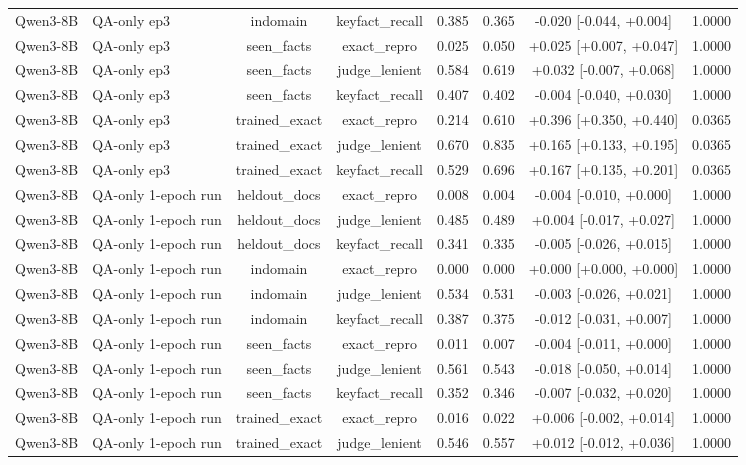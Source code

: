 \begin{table}[t]
{\begin{tabular}{llcccccc}
Qwen3-8B & QA-only ep3 & indomain & keyfact\_recall & 0.385 & 0.365 & -0.020 [-0.044, +0.004] & 1.0000 \\
Qwen3-8B & QA-only ep3 & seen\_facts & exact\_repro & 0.025 & 0.050 & +0.025 [+0.007, +0.047] & 1.0000 \\
Qwen3-8B & QA-only ep3 & seen\_facts & judge\_lenient & 0.584 & 0.619 & +0.032 [-0.007, +0.068] & 1.0000 \\
Qwen3-8B & QA-only ep3 & seen\_facts & keyfact\_recall & 0.407 & 0.402 & -0.004 [-0.040, +0.030] & 1.0000 \\
Qwen3-8B & QA-only ep3 & trained\_exact & exact\_repro & 0.214 & 0.610 & +0.396 [+0.350, +0.440] & 0.0365 \\
Qwen3-8B & QA-only ep3 & trained\_exact & judge\_lenient & 0.670 & 0.835 & +0.165 [+0.133, +0.195] & 0.0365 \\
Qwen3-8B & QA-only ep3 & trained\_exact & keyfact\_recall & 0.529 & 0.696 & +0.167 [+0.135, +0.201] & 0.0365 \\
Qwen3-8B & QA-only 1-epoch run & heldout\_docs & exact\_repro & 0.008 & 0.004 & -0.004 [-0.010, +0.000] & 1.0000 \\
Qwen3-8B & QA-only 1-epoch run & heldout\_docs & judge\_lenient & 0.485 & 0.489 & +0.004 [-0.017, +0.027] & 1.0000 \\
Qwen3-8B & QA-only 1-epoch run & heldout\_docs & keyfact\_recall & 0.341 & 0.335 & -0.005 [-0.026, +0.015] & 1.0000 \\
Qwen3-8B & QA-only 1-epoch run & indomain & exact\_repro & 0.000 & 0.000 & +0.000 [+0.000, +0.000] & 1.0000 \\
Qwen3-8B & QA-only 1-epoch run & indomain & judge\_lenient & 0.534 & 0.531 & -0.003 [-0.026, +0.021] & 1.0000 \\
Qwen3-8B & QA-only 1-epoch run & indomain & keyfact\_recall & 0.387 & 0.375 & -0.012 [-0.031, +0.007] & 1.0000 \\
Qwen3-8B & QA-only 1-epoch run & seen\_facts & exact\_repro & 0.011 & 0.007 & -0.004 [-0.011, +0.000] & 1.0000 \\
Qwen3-8B & QA-only 1-epoch run & seen\_facts & judge\_lenient & 0.561 & 0.543 & -0.018 [-0.050, +0.014] & 1.0000 \\
Qwen3-8B & QA-only 1-epoch run & seen\_facts & keyfact\_recall & 0.352 & 0.346 & -0.007 [-0.032, +0.020] & 1.0000 \\
Qwen3-8B & QA-only 1-epoch run & trained\_exact & exact\_repro & 0.016 & 0.022 & +0.006 [-0.002, +0.014] & 1.0000 \\
Qwen3-8B & QA-only 1-epoch run & trained\_exact & judge\_lenient & 0.546 & 0.557 & +0.012 [-0.012, +0.036] & 1.0000 \\

\end{tabular}}
\end{table}
